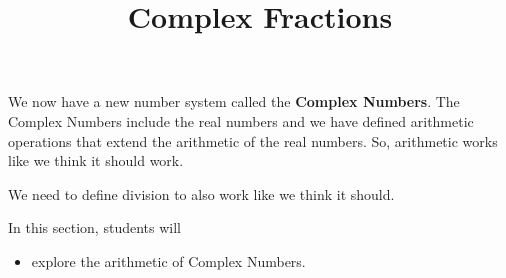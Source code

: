 \documentclass{ximera}
\title{Complex Fractions}
\begin{document}
\begin{abstract}
\end{abstract}
\maketitle







We now have a new number system called the \textbf{Complex Numbers}.  The Complex Numbers include the real numbers and we have defined arithmetic operations that extend the arithmetic of the real numbers.  So, arithmetic works like we think it should work.

We need to define division to also work like we think it should.  










\begin{sectionOutcomes}
In this section, students will 

\begin{itemize}
\item explore the arithmetic of Complex Numbers.
\end{itemize}
\end{sectionOutcomes}
\end{document}
